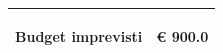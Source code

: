 \documentclass[a4paper]{article}
\begin{document}
                           \noindent\begin{tabular}{|L{133.1mm} |  L{16mm}| }
                           \hline
                           \vspace{2.5mm}
                           \begin{spacing}{0}
                                \textbf{Budget imprevisti}
                           \end{spacing} &
                           \vspace{2.5mm}
                           \begin{spacing}{0}
                            \euro\hfill
                           900.0
                              \end{spacing}\\
                              \hline
                              \end{tabular}
                           
\end{document}
